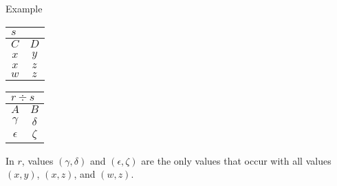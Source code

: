\begin{multicols}{2}
\begin{CheatsheetEntryFrame}
\begin{RelAlgSubsection}{Example}
\begin{center}
{                \quad
                \begin{tabular}{|cc|}
                    \multicolumn{2}{l}{\normalsize $s$}
                        \\ \hline
                    \multicolumn{1}{|c}{$C$}
                        & \multicolumn{1}{c|}{$D$}
                    \\ \hline \hline
                    $x$ & $y$ \\
                    $x$ & $z$ \\
                    $w$ & $z$ \\ \hline
                \end{tabular}
                \qquad\quad
                \begin{tabular}{|cc|}
                    \multicolumn{2}{l}{\normalsize $r \div s$}
                        \\ \hline
                    \multicolumn{1}{|c}{$A$}
                        & \multicolumn{1}{c|}{$B$}
                        \\ \hline\hline
                    $\gamma  $ & $\delta$ \\
                    $\epsilon$ & $\zeta $ \\ \hline
                \end{tabular}
            }
        \end{center}
        \medskip
        {\footnotesize%
            In $r$, values $(\gamma, \delta)$ and $(\epsilon, \zeta)$ are the only values that occur with all values $(x, y)$, $(x, z)$, and $(w, z)$.
        }
        \end{RelAlgSubsection}

    \end{CheatsheetEntryFrame}
    
\end{multicols}
\newpage

